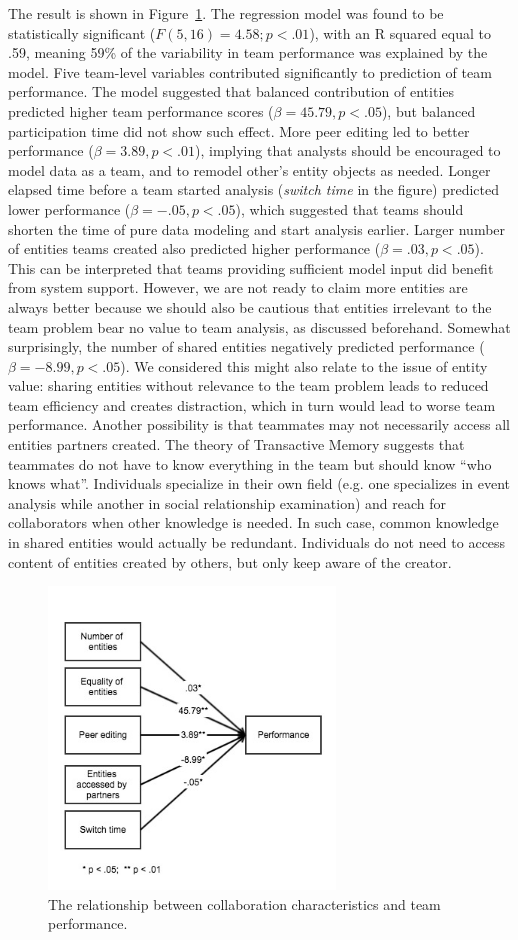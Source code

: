 The result is shown in Figure~\ref{fig:regression}. The regression model was found to be statistically significant ($F(5,16)=4.58; p<.01$), with an R squared equal to .59, meaning 59\% of the variability in team performance was explained by the model. Five team-level variables contributed significantly to prediction of team performance. The model suggested that balanced contribution of entities predicted higher team performance scores ($\beta=45.79, p<.05$), but balanced participation time did not show such effect. More peer editing led to better performance ($\beta=3.89, p<.01$), implying that analysts should be encouraged to model data as a team, and to remodel other's entity objects as needed. Longer elapsed time before a team started analysis (\emph{switch time} in the figure) predicted lower performance ($\beta=-.05, p<.05$), which suggested that teams should shorten the time of pure data modeling and start analysis earlier. Larger number of entities teams created also predicted higher performance ($\beta=.03, p<.05$). This can be interpreted that teams providing sufficient model input did benefit from system support. However, we are not ready to claim more entities are always better  because we should also be cautious that entities irrelevant to the team problem bear no value to team analysis, as discussed beforehand. Somewhat surprisingly, the number of shared entities negatively predicted performance ($\beta=-8.99, p<.05$). 
We considered this might also relate to the issue of entity value: sharing entities without relevance to the team problem leads to reduced team efficiency and creates distraction, which in turn would lead to worse team performance. Another possibility is that teammates may not necessarily access all entities partners created. The theory of Transactive Memory \cite{Wegner1987} suggests that teammates do not have to know everything in the team but should know ``who knows what''. Individuals specialize in their own field (e.g. one specializes in event analysis while another in social relationship examination) and reach for collaborators when other knowledge is needed. In such case, common knowledge in shared entities would actually be redundant. Individuals do not need to access content of entities created by others, but only keep aware of the creator.

\begin{figure}
\centering
\includegraphics[width=3.0000in]{img/team_analysis.jpg}
\caption{The relationship between collaboration characteristics and team performance.\label{fig:regression}}
\end{figure}

